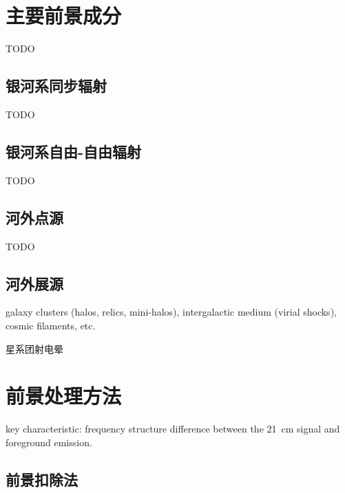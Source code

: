 \section{主要前景成分}

TODO

\subsection{银河系同步辐射}

TODO

\subsection{银河系自由-自由辐射}

TODO

\subsection{河外点源}

TODO

\subsection{河外展源}

galaxy clusters (halos, relics, mini-halos),
intergalactic medium (virial shocks),
cosmic filaments, etc.

星系团射电晕


\section{前景处理方法}

key characteristic: frequency structure difference between
the 21~cm signal and foreground emission.

\subsection{前景扣除法}

